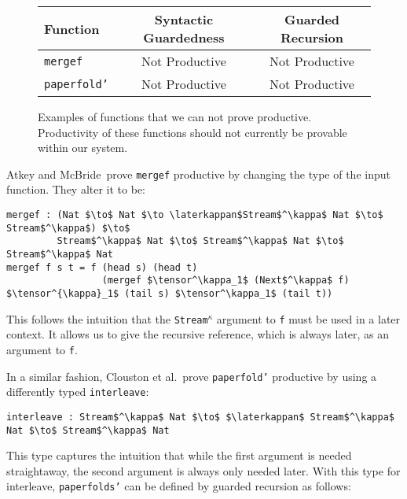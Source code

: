 \begin{figure}[h]
\begin{center}
  \begin{tabular}{| l | c | c |} \hline
    Function & Syntactic Guardedness & Guarded Recursion \\ \hline
    \texttt{mergef} & Not Productive & Not Productive \\ \hline
    \texttt{paperfold'} & Not Productive & Not Productive \\ \hline
  \end{tabular}
\end{center}
  \caption{Examples of functions that we can not prove productive. Productivity
    of these functions should not currently be provable within our system.}
  \label{fig:productivity_table_3}
\end{figure}

Atkey and McBride\,\citep{Atkey:2013} prove \texttt{mergef} productive by
changing the type of the input function. They alter it to be:

\begin{lstlisting}[mathescape, title=\idrisBlock]
mergef : (Nat $\to$ Nat $\to \laterkappan$Stream$^\kappa$ Nat $\to$ Stream$^\kappa$) $\to$
         Stream$^\kappa$ Nat $\to$ Stream$^\kappa$ Nat $\to$ Stream$^\kappa$ Nat
mergef f s t = f (head s) (head t) 
                 (mergef $\tensor^\kappa_1$ (Next$^\kappa$ f) $\tensor^{\kappa}_1$ (tail s) $\tensor^\kappa_1$ (tail t))
\end{lstlisting}

This follows the intuition that the \texttt{Stream$^\kappa$} argument to \texttt{f} must be used in a
later context. It allows us to give the recursive reference, which is always
later, as an argument to \texttt{f}.

In a similar fashion, Clouston et al.\,\citep{BirkedalL:guarded-lambda-conf}
prove \texttt{paperfold'} productive by using a differently typed \texttt{interleave}:

\begin{lstlisting}[mathescape, title=\idrisBlock]
interleave : Stream$^\kappa$ Nat $\to$ $\laterkappan$ Stream$^\kappa$ Nat $\to$ Stream$^\kappa$ Nat
\end{lstlisting}

This type captures the intuition that while the first argument is needed straightaway, the
second argument is always only needed later. With this type for interleave, \texttt{paperfolds'} can be defined by guarded recursion as
follows:


